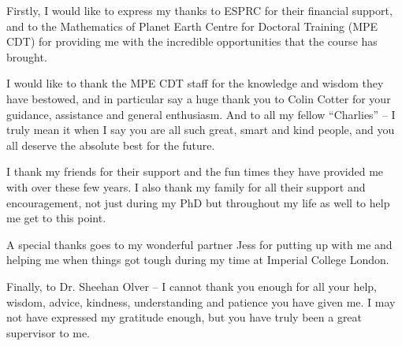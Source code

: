 
\cleardoublepage


\begin{acknowledgements}

Firstly, I would like to express my thanks to ESPRC for their financial support, and to the Mathematics of Planet Earth Centre for Doctoral Training (MPE CDT) for providing me with the incredible opportunities that the course has brought. 

I would like to thank the MPE CDT staff for the knowledge and wisdom they have bestowed, and in particular say a huge thank you to Colin Cotter for your guidance, assistance and general enthusiasm. And to all my fellow \enquote{Charlies} -- I truly mean it when I say you are all such great, smart and kind people, and you all deserve the absolute best for the future.

I thank my friends for their support and the fun times they have provided me with over these few years. I also thank my family for all their support and encouragement, not just during my PhD but throughout my life as well to help me get to this point.

A special thanks goes to my wonderful partner Jess for putting up with me and helping me when things got tough during my time at Imperial College London.

Finally, to Dr. Sheehan Olver -- I cannot thank you enough for all your help, wisdom, advice, kindness, understanding and patience you have given me. I may not have expressed my gratitude enough, but you have truly been a great supervisor to me.


%

\end{acknowledgements}
